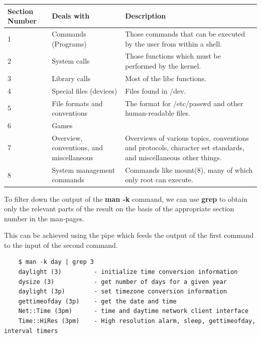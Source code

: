\documentclass{report}
\begin{document}
	\vspace{-5pt}
	\noindent
	\begin{tabular}{p{}p{}p{}}
		\toprule
		Section Number & Deals with & Description \\
		\midrule
		1 & Commands (Programs) & Those  commands  that  can  be executed  by the user from within a	shell. \\
		2 & System calls & Those functions which must be performed by the kernel. \\		
		3 & Library calls & Most of the libc functions. \\		
		4 & Special files (devices) & Files found in /dev. \\		
		5 & File formats and conventions & The format for /etc/passwd and other human-readable files. \\		
		6 & Games & \\		
		7 & Overview, conventions, and miscellaneous & Overviews of various topics, conventions and  protocols,  character set standards, and miscellaneous other things. \\		
		8 & System management commands & Commands like mount(8), many of which only root can execute.	\\
		\bottomrule
	\end{tabular}
	
	\noindent
	To filter down the output of the \textbf{man -k} command, we can use \textbf{grep} to obtain only the relevant parts of the result on the basis of the appropriate section number in the man-pages. 
	
	\noindent
	This can be achieved using the pipe which feeds the output of the first command to the input of the second command. 
	
	\vspace{-20pt}
	\begin{verbatim}
	$ man -k day | grep 3
	daylight (3)         - initialize time conversion information
	dysize (3)           - get number of days for a given year
	daylight (3p)        - set timezone conversion information
	gettimeofday (3p)    - get the date and time
	Net::Time (3pm)      - time and daytime network client interface
	Time::HiRes (3pm)    - High resolution alarm, sleep, gettimeofday, interval timers
	\end{verbatim}
	
	\vspace{-20pt}
	\noindent
	
\end{document}
